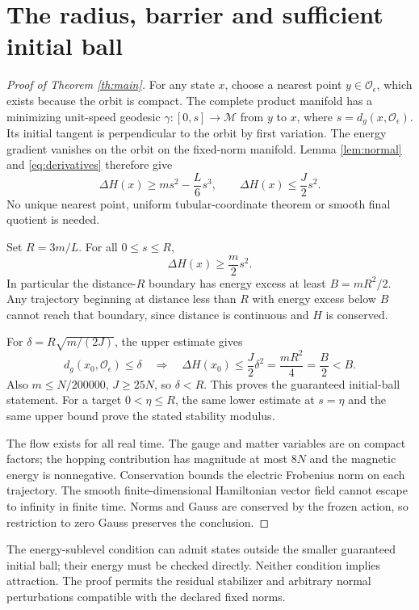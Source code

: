 \documentclass[11pt,a4paper]{article}
\begin{document}
\section{The radius, barrier and sufficient initial ball}
\begin{proof}[Proof of Theorem \ref{th:main}]
For any state $x$, choose a nearest point $y\in\mathcal O_\epsilon$, which exists because the orbit is compact. The complete product manifold has a minimizing unit-speed geodesic $\gamma:[0,s]\to\mathcal M$ from $y$ to $x$, where $s=d_g(x,\mathcal O_\epsilon)$. Its initial tangent is perpendicular to the orbit by first variation. The energy gradient vanishes on the orbit on the fixed-norm manifold. Lemma \ref{lem:normal} and \eqref{eq:derivatives} therefore give
\begin{equation}\label{eq:taylor}
\Delta H(x)\ge ms^2-\frac L6s^3,
\qquad \Delta H(x)\le\frac J2s^2.
\end{equation}
No unique nearest point, uniform tubular-coordinate theorem or smooth final quotient is needed.

Set $R=3m/L$. For all $0\le s\le R$,
\[
\Delta H(x)\ge\frac m2s^2.
\]
In particular the distance-$R$ boundary has energy excess at least $B=mR^2/2$. Any trajectory beginning at distance less than $R$ with energy excess below $B$ cannot reach that boundary, since distance is continuous and $H$ is conserved.

For $\delta=R\sqrt{m/(2J)}$, the upper estimate gives
\[
d_g(x_0,\mathcal O_\epsilon)\le\delta
\quad\Longrightarrow\quad \Delta H(x_0)\le\frac J2\delta^2
=\frac{mR^2}{4}=\frac B2<B.
\]
Also $m\le N/200000$, $J\ge25N$, so $\delta<R$. This proves the guaranteed initial-ball statement. For a target $0<\eta\le R$, the same lower estimate at $s=\eta$ and the same upper bound prove the stated stability modulus.

The flow exists for all real time. The gauge and matter variables are on compact factors; the hopping contribution has magnitude at most $8N$ and the magnetic energy is nonnegative. Conservation bounds the electric Frobenius norm on each trajectory. The smooth finite-dimensional Hamiltonian vector field cannot escape to infinity in finite time. Norms and Gauss are conserved by the frozen action, so restriction to zero Gauss preserves the conclusion.
\end{proof}
The energy-sublevel condition can admit states outside the smaller guaranteed initial ball; their energy must be checked directly. Neither condition implies attraction. The proof permits the residual stabilizer and arbitrary normal perturbations compatible with the declared fixed norms.
\end{document}

